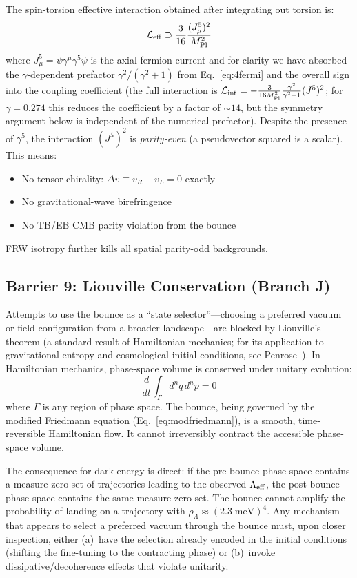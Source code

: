 \documentclass[aps,prd,twocolumn,superscriptaddress,showpacs,preprintnumbers,nofootinbib,longbibliography,floatfix]{revtex4-2}
\newcommand{\MPl}{M_{\rm Pl}}
\begin{document}
The spin-torsion effective interaction obtained after integrating out torsion is:
\begin{equation}
\mathcal{L}_{\rm eff} \supset \frac{3}{16} \frac{(J^5_\mu)^2}{\MPl^2}
\end{equation}
where $J^5_\mu = \bar{\psi}\gamma^\mu\gamma^5\psi$ is the axial fermion current and for clarity we have absorbed the $\gamma$-dependent prefactor $\gamma^2/(\gamma^2+1)$ from Eq.~\eqref{eq:4fermi} and the overall sign into the coupling coefficient (the full interaction is $\mathcal{L}_{\rm int} = -\frac{3}{16\MPl^2}\frac{\gamma^2}{\gamma^2+1}(J^5)^2$; for $\gamma = 0.274$ this reduces the coefficient by a factor of $\sim 14$, but the symmetry argument below is independent of the numerical prefactor). Despite the presence of $\gamma^5$, the interaction $(J^5)^2$ is \emph{parity-even} (a pseudovector squared is a scalar). This means:
\begin{itemize}
\item No tensor chirality: $\Delta v \equiv v_R - v_L = 0$ exactly
\item No gravitational-wave birefringence
\item No TB/EB CMB parity violation from the bounce
\end{itemize}
FRW isotropy further kills all spatial parity-odd backgrounds.

\subsection{Barrier 9: Liouville Conservation (Branch J)}

Attempts to use the bounce as a ``state selector''---choosing a preferred vacuum or field configuration from a broader landscape---are blocked by Liouville's theorem (a standard result of Hamiltonian mechanics; for its application to gravitational entropy and cosmological initial conditions, see Penrose~\cite{Penrose1979}). In Hamiltonian mechanics, phase-space volume is conserved under unitary evolution:
\begin{equation}
\frac{d}{dt}\int_{\Gamma} d^nq\,d^np = 0
\end{equation}
where $\Gamma$ is any region of phase space. The bounce, being governed by the modified Friedmann equation (Eq.~\ref{eq:modfriedmann}), is a smooth, time-reversible Hamiltonian flow. It cannot irreversibly contract the accessible phase-space volume.

The consequence for dark energy is direct: if the pre-bounce phase space contains a measure-zero set of trajectories leading to the observed $\Lambda_{\rm eff}$, the post-bounce phase space contains the same measure-zero set. The bounce cannot amplify the probability of landing on a trajectory with $\rho_\Lambda \approx (2.3\;\text{meV})^4$. Any mechanism that appears to select a preferred vacuum through the bounce must, upon closer inspection, either (a)~have the selection already encoded in the initial conditions (shifting the fine-tuning to the contracting phase) or (b)~invoke dissipative/decoherence effects that violate unitarity.
\end{document}
